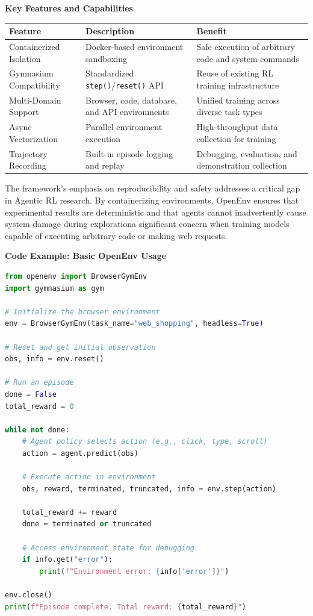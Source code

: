 \textbf{Key Features and Capabilities}

\begin{table}[tbp]
\centering
\footnotesize
\begin{tabularx}{\textwidth}{YYY}
\toprule
\textbf{Feature} & \textbf{Description} & \textbf{Benefit} \\
\midrule
Containerized Isolation & Docker-based environment sandboxing & Safe execution of arbitrary code and system commands \\
Gymnasium Compatibility & Standardized \texttt{step()}/\texttt{reset()} API & Reuse of existing RL training infrastructure \\
Multi-Domain Support & Browser, code, database, and API environments & Unified training across diverse task types \\
Async Vectorization & Parallel environment execution & High-throughput data collection for training \\
Trajectory Recording & Built-in episode logging and replay & Debugging, evaluation, and demonstration collection \\
\bottomrule
\end{tabularx}
\end{table}

The framework's emphasis on reproducibility and safety addresses a critical gap in Agentic RL research. By containerizing environments, OpenEnv ensures that experimental results are deterministic and that agents cannot inadvertently cause system damage during explorationa significant concern when training models capable of executing arbitrary code or making web requests.

\textbf{Code Example: Basic OpenEnv Usage}

\begin{lstlisting}[language=Python]
from openenv import BrowserGymEnv
import gymnasium as gym

# Initialize the browser environment
env = BrowserGymEnv(task_name="web_shopping", headless=True)

# Reset and get initial observation
obs, info = env.reset()

# Run an episode
done = False
total_reward = 0

while not done:
    # Agent policy selects action (e.g., click, type, scroll)
    action = agent.predict(obs)
    
    # Execute action in environment
    obs, reward, terminated, truncated, info = env.step(action)
    
    total_reward += reward
    done = terminated or truncated
    
    # Access environment state for debugging
    if info.get("error"):
        print(f"Environment error: {info['error']}")

env.close()
print(f"Episode complete. Total reward: {total_reward}")
\end{lstlisting}

